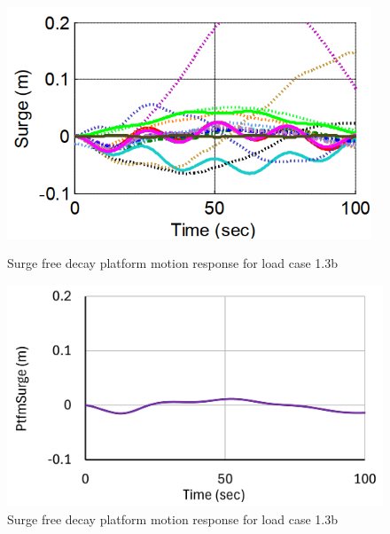 \documentclass[a4paper, 11pt]{article}
\begin{document}
\begin{figure}[H]
    \begin{minipage}{0.47\textwidth}
        \centering
        \includegraphics[width=0.97\textwidth]{1.3b_surge.png}
        \caption{\small Surge free decay platform motion response for load case 1.3b \cite{Robertson2014}}
        \label{fig:1.3b_surge}
    \end{minipage}
    \hfill
    \begin{minipage}{0.5\textwidth}
        \centering
        \includegraphics[width=1\textwidth]{1.3b_surge_mine.png}
        \caption{\small Surge free decay platform motion response for load case 1.3b}
        \label{fig:1.3b_surge_mine}
    \end{minipage}
\end{figure}
\end{document}
